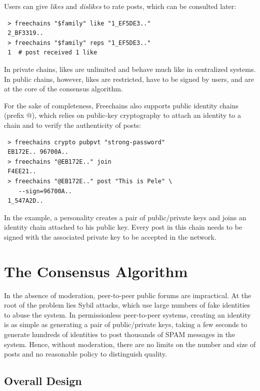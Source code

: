 \documentclass[10pt,journal,compsoc]{IEEEtran}
\newcommand{\FC}   {Freechains\xspace}
\begin{document}
Users can give \emph{likes} and \emph{dislikes} to rate posts, which can be
consulted later:

{\footnotesize
\begin{verbatim}
 > freechains "$family" like "1_EF5DE3.."
 2_BF3319..
 > freechains "$family" reps "1_EF5DE3.."
 1  # post received 1 like
\end{verbatim}
}

In private chains, likes are unlimited and behave much like in centralized
systems.
In public chains, however, likes are restricted, have to be signed by users,
and are at the core of the consensus algorithm.

For the sake of completeness, \FC also supports public identity chains (prefix
$@$), which relies on public-key cryptography to attach an identity to a chain
and to verify the authenticity of posts:

{\footnotesize
\begin{verbatim}
 > freechains crypto pubpvt "strong-password"
 EB172E.. 96700A..
 > freechains "@EB172E.." join
 F4EE21..
 > freechains "@EB172E.." post "This is Pele" \
    --sign=96700A..
 1_547A2D..
\end{verbatim}
}

In the example, a personality creates a pair of public/private keys and joins
an identity chain attached to his public key.
Every post in this chain needs to be signed with the associated private key to
be accepted in the network.

\section{The Consensus Algorithm}
\label{sec.consensus}

In the absence of moderation, peer-to-peer public forums are impractical.
At the root of the problem lies Sybil attacks, which use large numbers of fake
identities to abuse the system.
In permissionless peer-to-peer systems, creating an identity is as simple as
generating a pair of public/private keys, taking a few seconds to generate
hundreds of identities to post thousands of SPAM messages in the system.
Hence, without moderation, there are no limits on the number and size of posts
and no reasonable policy to distinguish quality.

\subsection{Overall Design}
\end{document}
